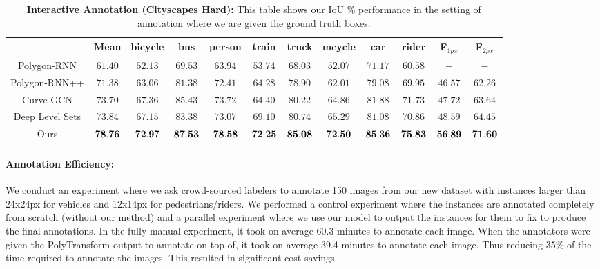 \documentclass[10pt,twocolumn,letterpaper]{article}
\begin{document}
\begin{table*}[t!]
\centering
  \begin{tabular}{|c|c|cccccccc|cc|}
  \cline{2-12}
  \multicolumn{1}{c|}{}  & Mean & \multicolumn{1}{c}{bicycle} & \multicolumn{1}{c}{bus} & \multicolumn{1}{c}{person} & \multicolumn{1}{c}{train} & \multicolumn{1}{c}{truck} & \multicolumn{1}{c}{mcycle} & \multicolumn{1}{c}{car} & rider & \multicolumn{1}{c}{F$_{1px}$} & \multicolumn{1}{c|}{F$_{2px}$}  \\ 
  \hline 
    
  Polygon-RNN \cite{polygon-rnn} 
    &$61.40$ &$52.13$ &$69.53$ &$63.94$ &$53.74$ &$68.03$ &$52.07$ &$71.17$ &$60.58$ &$-$ &$-$ \\ 
  Polygon-RNN++  \cite{polygon-rnn++} 
    &$71.38$ &$63.06$ &$81.38$ &$72.41$ &$64.28$ &$78.90$ &$62.01$ &$79.08$ &$69.95$ &$46.57$ &$62.26$ \\
  Curve GCN  \cite{ling2019fast} 
    &$73.70$ &$67.36$ &$ 85.43 $ &$73.72$ &$ 64.40$ &$ 80.22$ &$ 64.86 $ &$81.88$ &$ 71.73$ &$47.72$ &$63.64$\\
  Deep Level Sets \cite{wang2019delse}
    &$73.84$ &$67.15$ &$83.38$ &$73.07$ &$69.10$ &$80.74$ &$65.29 $ &$81.08$ &$ 70.86 $ &$48.59$ &$64.45$\\
  Ours 
    &$\bf{78.76}$ &$\bf{72.97}$ &$\bf{87.53}$ &$\bf{78.58}$ &$\bf{72.25}$ &$\bf{85.08}$ &$\bf{72.50}$  &$\bf{85.36}$ &$\bf{75.83}$ &$\bf{56.89}$ &$\bf{71.60}$\\
  \hline 
  
  \end{tabular}
  \caption{\textbf{Interactive Annotation (Cityscapes Hard):} This table shows our IoU \% performance in the setting of annotation where we are given the ground truth boxes.}
  \label{tab:anno-results-hard}
  \vspace{-5mm}
\end{table*}

\vspace{-2mm}

\paragraph{Annotation Efficiency:}
We conduct an experiment where we ask crowd-sourced labelers to annotate 150 images from our new dataset with instances larger than 24x24px for vehicles and 12x14px for pedestrians/riders. We performed a control experiment where the instances are annotated completely from scratch (without our method) and a parallel experiment where we use our model to output the instances for them to fix to produce the final annotations. In the fully manual experiment, it took on average 60.3 minutes to annotate each image. When the annotators were given the PolyTransform output to annotate on top of, it took on average 39.4 minutes to annotate each image. Thus reducing  35\% of the time required to annotate the images. This resulted in significant cost savings. 
\end{document}
